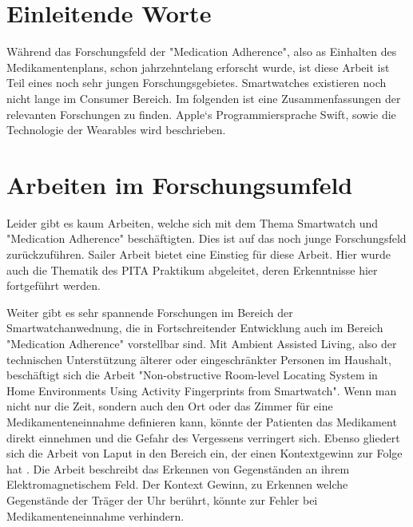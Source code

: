 

\section{Einleitende Worte}
Während das Forschungsfeld der "Medication Adherence", also as Einhalten des Medikamentenplans, schon jahrzehntelang erforscht wurde, ist diese Arbeit ist Teil eines noch sehr jungen Forschungsgebietes. Smartwatches existieren noch nicht lange im Consumer Bereich. Im folgenden ist eine Zusammenfassungen der relevanten Forschungen zu finden. Apple`s Programmiersprache Swift, sowie die Technologie der Wearables wird beschrieben.
\section{Arbeiten im Forschungsumfeld}
Leider gibt es kaum Arbeiten, welche sich mit dem Thema Smartwatch und "Medication Adherence" beschäftigten. Dies ist auf das noch junge Forschungsfeld zurückzuführen. Sailer Arbeit \cite{Fabian-Sailer:2015aa} bietet eine Einstieg für diese Arbeit. Hier wurde auch die Thematik des PITA Praktikum abgeleitet, deren Erkenntnisse hier fortgeführt werden. 

Weiter gibt es sehr spannende Forschungen im Bereich der Smartwatchanwednung, die in Fortschreitender Entwicklung auch im Bereich "Medication Adherence" vorstellbar sind. Mit Ambient Assisted Living, also der technischen Unterstützung älterer oder eingeschränkter Personen im Haushalt, beschäftigt sich die Arbeit "Non-obstructive Room-level Locating System in Home Environments Using Activity Fingerprints from Smartwatch"\cite{Lee:2015:NRL:2750858.2804272}. Wenn man nicht nur die Zeit, sondern auch den Ort oder das Zimmer für eine Medikamenteneinnahme definieren kann, könnte der Patienten das Medikament direkt einnehmen und die Gefahr des Vergessens verringert sich. Ebenso gliedert sich die Arbeit von Laput in den Bereich ein, der einen Kontextgewinn zur Folge hat \cite{Laput:2015:ETR:2807442.2807481}. Die Arbeit beschreibt das Erkennen von Gegenständen an ihrem Elektromagnetischem Feld. Der Kontext Gewinn, zu Erkennen welche Gegenstände der Träger der Uhr berührt, könnte zur Fehler bei Medikamenteneinnahme verhindern.

